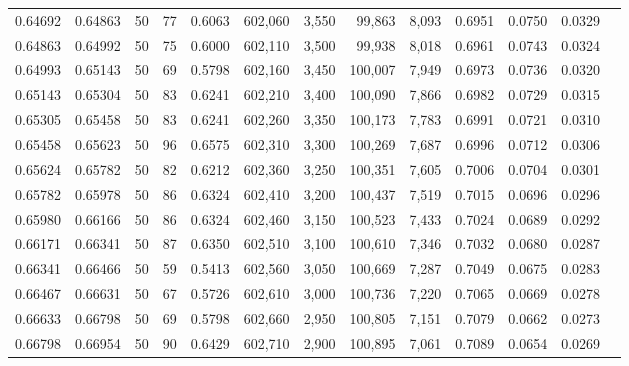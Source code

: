 \begin{tabular}{rrrrrrrrrrrrr}
0.64692 & 0.64863 &    50 &  77 &                                     0.6063 & 602,060 &   3,550 &  99,863 &   8,093 & 0.6951 & 0.0750 & 0.0329 \\
0.64863 & 0.64992 &    50 &  75 &                                     0.6000 & 602,110 &   3,500 &  99,938 &   8,018 & 0.6961 & 0.0743 & 0.0324 \\
0.64993 & 0.65143 &    50 &  69 &                                     0.5798 & 602,160 &   3,450 & 100,007 &   7,949 & 0.6973 & 0.0736 & 0.0320 \\
0.65143 & 0.65304 &    50 &  83 &                                     0.6241 & 602,210 &   3,400 & 100,090 &   7,866 & 0.6982 & 0.0729 & 0.0315 \\
0.65305 & 0.65458 &    50 &  83 &                                     0.6241 & 602,260 &   3,350 & 100,173 &   7,783 & 0.6991 & 0.0721 & 0.0310 \\
0.65458 & 0.65623 &    50 &  96 &                                     0.6575 & 602,310 &   3,300 & 100,269 &   7,687 & 0.6996 & 0.0712 & 0.0306 \\
0.65624 & 0.65782 &    50 &  82 &                                     0.6212 & 602,360 &   3,250 & 100,351 &   7,605 & 0.7006 & 0.0704 & 0.0301 \\
0.65782 & 0.65978 &    50 &  86 &                                     0.6324 & 602,410 &   3,200 & 100,437 &   7,519 & 0.7015 & 0.0696 & 0.0296 \\
0.65980 & 0.66166 &    50 &  86 &                                     0.6324 & 602,460 &   3,150 & 100,523 &   7,433 & 0.7024 & 0.0689 & 0.0292 \\
0.66171 & 0.66341 &    50 &  87 &                                     0.6350 & 602,510 &   3,100 & 100,610 &   7,346 & 0.7032 & 0.0680 & 0.0287 \\
0.66341 & 0.66466 &    50 &  59 &                                     0.5413 & 602,560 &   3,050 & 100,669 &   7,287 & 0.7049 & 0.0675 & 0.0283 \\
0.66467 & 0.66631 &    50 &  67 &                                     0.5726 & 602,610 &   3,000 & 100,736 &   7,220 & 0.7065 & 0.0669 & 0.0278 \\
0.66633 & 0.66798 &    50 &  69 &                                     0.5798 & 602,660 &   2,950 & 100,805 &   7,151 & 0.7079 & 0.0662 & 0.0273 \\
0.66798 & 0.66954 &    50 &  90 &                                     0.6429 & 602,710 &   2,900 & 100,895 &   7,061 & 0.7089 & 0.0654 & 0.0269 \\

\end{tabular}
